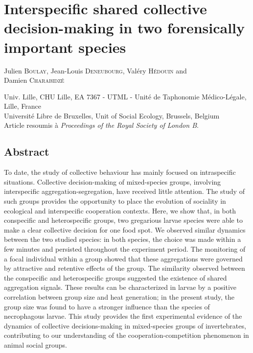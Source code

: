 
\chapter{Interspecific shared collective decision-making in two forensically important species} %

\label{Chapter4} %


Julien \textsc{Boulay}, Jean-Louis \textsc{Deneubourg},  Valéry \textsc{Hédouin} and \\ Damien \textsc{Charabidzé}

 Univ. Lille, CHU Lille, EA 7367 - UTML - Unité de Taphonomie Médico-Légale, Lille, France\\
 Université Libre de Bruxelles, Unit of Social Ecology, Brussels, Belgium\\




Article resoumis à \emph{Proceedings of the Royal Society of London B}.


\cleardoublepage
	\section{Abstract}
To date, the study of collective behaviour has mainly focused on intraspecific situations. Collective decision-making of mixed-species groups, involving interspecific aggregation-segregation, have received little attention. The study of such groups provides the opportunity to place the evolution of sociality in ecological and interspecific cooperation contexts. Here, we show that, in both conspecific and heterospecific groups, two gregarious larvae species were able to make a clear collective decision for one food spot. We observed similar dynamics between the two studied species: in both species, the choice was made within a few minutes and persisted throughout the experiment period. The monitoring of a focal individual within a group showed that these aggregations were governed by attractive and retentive effects of the group. The similarity observed between the conspecific and heterospecific groups suggested the existence of shared aggregation signals. These results can be characterized in larvae by a positive correlation between group size and heat generation; in the present study, the group size was found to have a stronger influence than the species of necrophagous larvae. This study provides the first experimental evidence of the dynamics of collective decisions-making in mixed-species groups of invertebrates, contributing to our understanding of the cooperation-competition phenomenon in animal social groups.

